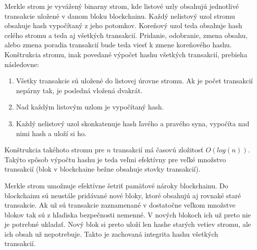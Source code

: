 Merkle strom je vyvážený binarny strom, kde listové uzly obsahujú jednotlivé transakcie uložené v danom bloku blockchainu. Každý nelistový uzol stromu obsahuje hash vypočítaný z jeho potomkov. Koreňový uzol teda obsahuje hash celého stromu a teda aj všetkých transakcií. Pridanie, odobranie, zmena obsahu, alebo zmena poradia transakcií bude teda viesť k zmene koreňového hashu. Konštrukcia stromu, inak povedané výpočet hashu všetkých transakcií, prebieha následovne:
\begin{enumerate}
	\item Všetky transakcie sú uložené do listovej úrovne stromu. Ak je počet transakcií nepárny tak, je posledná vložená dvakrát.
	\item Nad každým listovým uzlom je vypočítaný hash.
	\item Každý nelistový uzol skonkatenuje hash ľavého a pravého syna, vypočíta nad nimi hash a uloží si ho. 
\end{enumerate}
Konštrukcia takéhoto stromu pre $n$ transakcií má časovú zložitosť $O(log(n))$. Takýto spôsob výpočtu hashu je teda veľmi efektívny pre veľké množstvo transakcií (blok v blockchaine bežne obsahuje stovky transakcií).~\cite{merkleTreeBosamia}

Merkle strom umožnuje efektívne šetriť pamäťové nároky blockchainu. Do blockchainu sú neustále pridávané nové bloky, ktoré obsahujú aj rovnaké staré transakcie. Ak už sú transakcie zaznamenané v dostatočne veľkom množstve blokov tak sú z hľadiska bezpečnosti nemenné. V nových blokoch ich už preto nie je potrebné ukladať. Nový blok si preto uloží len hashe starých vetiev stromu, ale ich obsah už nepotrebuje. Takto je zachovaná integrita hashu všetkých transakcií.~\cite{satoshiBitcoin}


